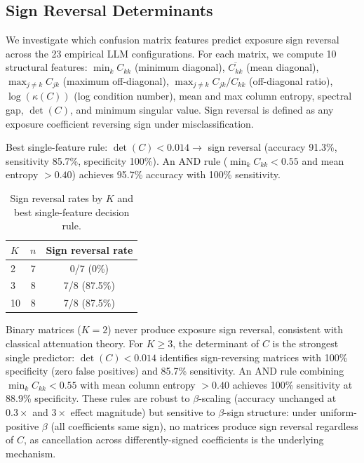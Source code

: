 \subsection{Sign Reversal Determinants}
\label{sec:sign_determinants}

We investigate which confusion matrix features predict exposure sign reversal across the 23 empirical LLM configurations. For each matrix, we compute 10 structural features: $\min_k C_{kk}$ (minimum diagonal), $\overline{C_{kk}}$ (mean diagonal), $\max_{j \neq k} C_{jk}$ (maximum off-diagonal), $\max_{j \neq k} C_{jk}/C_{kk}$ (off-diagonal ratio), $\log(\kappa(C))$ (log condition number), mean and max column entropy, spectral gap, $\det(C)$, and minimum singular value. Sign reversal is defined as any exposure coefficient reversing sign under misclassification.

Best single-feature rule: $\det(C) < 0.014 \to$ sign reversal (accuracy 91.3\%, sensitivity 85.7\%, specificity 100\%). An AND rule ($\min_k C_{kk} < 0.55$ and mean entropy $> 0.40$) achieves 95.7\% accuracy with 100\% sensitivity.

\begin{table}[H]
\centering
\small
\caption{Sign reversal rates by $K$ and best single-feature decision rule.}
\label{tab:sign_determinants}
\begin{tabular}{lcc}
\toprule
$K$ & $n$ & Sign reversal rate \\
\midrule
2 & 7 & 0/7 (0\%) \\
3 & 8 & 7/8 (87.5\%) \\
10 & 8 & 7/8 (87.5\%) \\
\bottomrule
\end{tabular}
\end{table}

Binary matrices ($K{=}2$) never produce exposure sign reversal, consistent with classical attenuation theory. For $K \geq 3$, the determinant of $C$ is the strongest single predictor: $\det(C) < 0.014$ identifies sign-reversing matrices with 100\% specificity (zero false positives) and 85.7\% sensitivity. An AND rule combining $\min_k C_{kk} < 0.55$ with mean column entropy $> 0.40$ achieves 100\% sensitivity at 88.9\% specificity. These rules are robust to $\beta$-scaling (accuracy unchanged at $0.3{\times}$ and $3{\times}$ effect magnitude) but sensitive to $\beta$-sign structure: under uniform-positive $\beta$ (all coefficients same sign), no matrices produce sign reversal regardless of $C$, as cancellation across differently-signed coefficients is the underlying mechanism.

